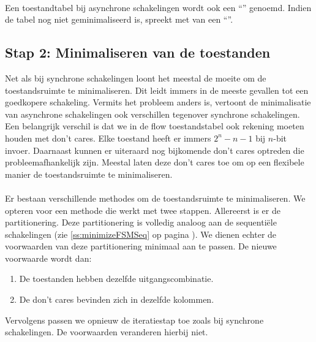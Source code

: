 \paragraph{}Een toestandtabel bij asynchrone schakelingen wordt ook een ``'' genoemd. Indien de tabel nog niet geminimaliseerd is, spreekt met van een ``''.
\subsection{Stap 2: Minimaliseren van de toestanden}
Net als bij synchrone schakelingen loont het meestal de moeite om de toestandsruimte te minimaliseren. Dit leidt immers in de meeste gevallen tot een goedkopere schakeling. Vermits het probleem anders is, vertoont de minimalisatie van asynchrone schakelingen ook verschillen tegenover synchrone schakelingen. Een belangrijk verschil is dat we in de flow toestandstabel ook rekening moeten houden met don't cares. Elke toestand heeft er immers $2^n-n-1$ bij $n$-bit invoer. Daarnaast kunnen er uiteraard nog bijkomende don't cares optreden die probleemafhankelijk zijn. Meestal laten deze don't cares toe om op een flexibele manier de toestandsruimte te minimaliseren.
\paragraph{}
Er bestaan verschillende methodes om de toestandsruimte te minimaliseren. We opteren voor een methode die werkt met twee stappen. Allereerst is er de partitionering. Deze partitionering is volledig analoog aan de sequenti\"ele schakelingen (zie \ref{ss:minimizeFSMSeq} op pagina \pageref{ss:minimizeFSMSeq}).
We dienen echter de voorwaarden van deze partitionering minimaal aan te passen. De nieuwe voorwaarde wordt dan:
\begin{enumerate}
 \item De toestanden hebben dezelfde uitgangscombinatie.
 \item De don't cares bevinden zich in dezelfde kolommen.
\end{enumerate}
Vervolgens passen we opnieuw de iteratiestap toe zoals bij synchrone schakelingen. De voorwaarden veranderen hierbij niet.
